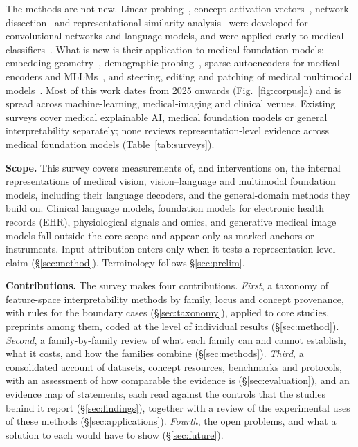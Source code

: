 The methods are not new. Linear probing~\cite{alain2016understanding}, concept activation
vectors~\cite{kim2018interpretability}, network dissection~\cite{bau2017network} and representational
similarity analysis~\cite{kriegeskorte2008representational} were developed for convolutional networks and
language models, and were applied early to medical classifiers~\cite{lucieri2020interpretability}. What is
new is their application to medical foundation models: embedding geometry~\cite{restrepo2026cone},
demographic probing~\cite{zheng2024demographic}, sparse autoencoders for medical encoders and
MLLMs~\cite{bouzid2025insights,nakka2025mammosae,wesp2026sparse}, and steering, editing and patching of
medical multimodal models~\cite{nooralahzadeh2026universal,zhu2026evaluating,sadanandan2026mechanistically}.
Most of this work dates from 2025 onwards (Fig.~\ref{fig:corpus}a) and is spread across machine-learning,
medical-imaging and clinical venues. Existing surveys cover medical explainable AI, medical foundation
models or general interpretability separately; none reviews representation-level evidence across medical
foundation models (Table~\ref{tab:surveys}).

\textbf{Scope.} This survey covers measurements of, and interventions on, the internal representations of
medical vision, vision--language and multimodal foundation models, including their language decoders, and
the general-domain methods they build on. Clinical language models, foundation models for electronic health
records (EHR), physiological signals and omics, and generative medical image models fall outside the core
scope and appear only as marked anchors or instruments. Input attribution enters only when it tests a
representation-level claim (\S\ref{sec:method}). Terminology follows \S\ref{sec:prelim}.

\textbf{Contributions.} The survey makes four contributions. \textit{First}, a taxonomy of feature-space
interpretability methods by family, locus and concept provenance, with rules for the boundary cases
(\S\ref{sec:taxonomy}), applied to \Ncore{} core studies, \Npreprint{} preprints among them, coded at
the level of individual results (\S\ref{sec:method}). \textit{Second}, a family-by-family review of what each family can and cannot
establish, what it costs, and how the families combine (\S\ref{sec:methods}). \textit{Third}, a
consolidated account of datasets, concept resources, benchmarks and protocols, with an assessment of how
comparable the evidence is (\S\ref{sec:evaluation}), and an evidence map of \Fnrows{} statements, each
read against the controls that the studies behind it report (\S\ref{sec:findings}), together with a review
of the experimental uses of these methods (\S\ref{sec:applications}). \textit{Fourth}, the open problems,
and what a solution to each would have to show (\S\ref{sec:future}).

